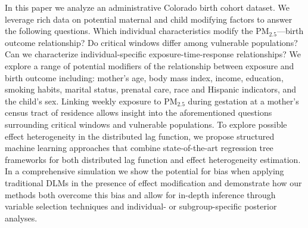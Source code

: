 \documentclass[12pt]{article}
\begin{document}



In this paper we analyze an administrative Colorado birth cohort dataset. We leverage rich data on potential maternal and child modifying factors to answer the following questions. Which individual characteristics modify the PM$_{2.5}$---birth outcome relationship? Do critical windows differ among vulnerable populations? Can we characterize individual-specific exposure-time-response relationships? We explore a range of potential modifiers of the relationship between exposure and birth outcome including: mother's age, body mass index, income, education, smoking habits, marital status, prenatal care, race and Hispanic indicators, and the child's sex. Linking weekly exposure to PM$_{2.5}$ during gestation at a mother's census tract of residence allows insight into the aforementioned questions surrounding critical windows and vulnerable populations. To explore possible effect heterogeneity in the distributed lag function, we propose structured machine learning approaches that combine state-of-the-art regression tree frameworks for both distributed lag function and effect heterogeneity estimation. In a comprehensive simulation we show the potential for bias when applying traditional DLMs in the presence of effect modification and demonstrate how our methods both overcome this bias and allow for in-depth inference through variable selection techniques and individual- or subgroup-specific posterior analyses.
\end{document}
